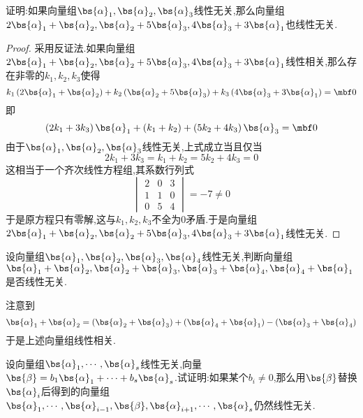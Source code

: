 \documentclass{ctexart}
\begin{document}
\begin{homework}[4]
    证明:如果向量组$\bs{\alpha}_1,\bs{\alpha}_2,\bs{\alpha}_3$线性无关,那么向量组$2\bs{\alpha}_1+\bs{\alpha}_2,\bs{\alpha}_2+5\bs{\alpha}_3,4\bs{\alpha}_3+3\bs{\alpha}_1$也线性无关.
\end{homework}
\begin{proof}
    采用反证法.如果向量组$2\bs{\alpha}_1+\bs{\alpha}_2,\bs{\alpha}_2+5\bs{\alpha}_3,4\bs{\alpha}_3+3\bs{\alpha}_1$线性相关,那么存在非零的$k_1,k_2,k_3$使得
    \[k_1\left(2\bs{\alpha}_1+\bs{\alpha}_2\right)+k_2\left(\bs{\alpha}_2+5\bs{\alpha}_3\right)+k_3\left(4\bs{\alpha}_3+3\bs{\alpha}_1\right)=\mbf0\]
    即
    \[\left(2k_1+3k_3\right)\bs{\alpha}_1+\left(k_1+k_2\right)+\left(5k_2+4k_3\right)\bs{\alpha}_3=\mbf0\]
    由于$\bs{\alpha}_1,\bs{\alpha}_2,\bs{\alpha}_3$线性无关,上式成立当且仅当
    \[2k_1+3k_3=k_1+k_2=5k_2+4k_3=0\]
    这相当于一个齐次线性方程组,其系数行列式
    \[\begin{vmatrix}
        2&0&3\\1&1&0\\0&5&4
    \end{vmatrix}=-7\neq0\]
    于是原方程只有零解,这与$k_1,k_2,k_3$不全为$0$矛盾.于是向量组$2\bs{\alpha}_1+\bs{\alpha}_2,\bs{\alpha}_2+5\bs{\alpha}_3,4\bs{\alpha}_3+3\bs{\alpha}_1$线性无关.
\end{proof}
\begin{homework}[5]
    设向量组$\bs{\alpha}_1,\bs{\alpha}_2,\bs{\alpha}_3,\bs{\alpha}_4$线性无关,判断向量组$\bs{\alpha}_1+\bs{\alpha}_2,\bs{\alpha}_2+\bs{\alpha}_3,\bs{\alpha}_3+\bs{\alpha}_4,\bs{\alpha}_4+\bs{\alpha}_1$是否线性无关.
\end{homework}
\begin{solution}
    注意到
    \[\bs{\alpha}_1+\bs{\alpha}_2=\left(\bs{\alpha}_2+\bs{\alpha}_3\right)+\left(\bs{\alpha}_4+\bs{\alpha}_1\right)-\left(\bs{\alpha}_3+\bs{\alpha}_4\right)\]
    于是上述向量组线性相关.
\end{solution}
\begin{homework}[6]
    设向量组$\bs{\alpha}_1,\cdots,\bs{\alpha}_s$线性无关,向量$\bs{\beta}=b_1\bs{\alpha}_1+\cdots+b_s\bs{\alpha}_s$.试证明:如果某个$b_i\neq0$,那么用$\bs{\beta}$替换$\bs{\alpha}_i$后得到的向量组$\bs{\alpha}_1,\cdots,\bs{\alpha}_{i-1},\bs{\beta},\bs{\alpha}_{i+1},\cdots,\bs{\alpha}_s$仍然线性无关.
\end{homework}
\end{document}
